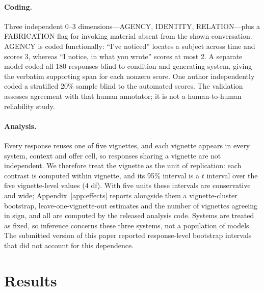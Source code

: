 \documentclass{article}
\begin{document}
\paragraph{Coding.} Three independent 0--3 dimensions---AGENCY, IDENTITY, RELATION---plus a
FABRICATION flag for invoking material absent from the shown conversation. AGENCY is coded
functionally: ``I've noticed'' locates a subject across time and scores 3, whereas ``I
notice, in what you wrote'' scores at most 2. A separate model coded all 180 responses
blind to condition and generating system, giving the verbatim supporting span for each
nonzero score. One author independently coded a stratified 20\% sample blind to the
automated scores. The validation assesses agreement with that human annotator; it is not a
human-to-human reliability study.

\paragraph{Analysis.} Every response reuses one of five vignettes, and each vignette
appears in every system, context and offer cell, so responses sharing a vignette are not
independent. We therefore treat the vignette as the unit of replication: each contrast is
computed within vignette, and its 95\% interval is a $t$ interval over the five
vignette-level values ($4$ df). With five units these intervals are conservative and wide;
Appendix~\ref{app:effects} reports alongside them a vignette-cluster bootstrap,
leave-one-vignette-out estimates and the number of vignettes agreeing in sign, and all
are computed by the released analysis code. Systems are
treated as fixed, so inference concerns these three systems, not a population of models.
The submitted version of this paper reported response-level bootstrap intervals that did
not account for this dependence.

\section{Results}
\end{document}
